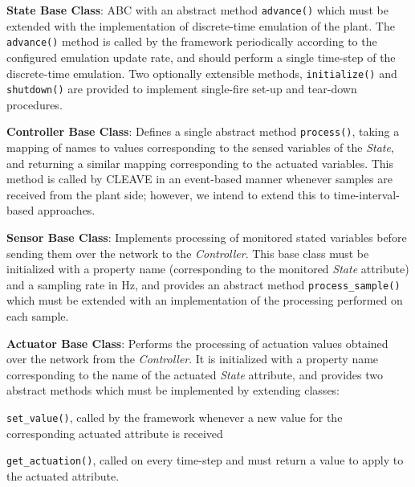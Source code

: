 \textbf{State Base Class}:
\gls{ABC} with an abstract method
\texttt{advance()} which must be extended with the implementation of discrete-time emulation of the plant.
The \texttt{advance()} method is called by the framework periodically according to the configured emulation update rate, and should perform a single time-step of the discrete-time emulation.
Two optionally extensible methods, \texttt{initialize()} and \texttt{shutdown()} are provided to implement single-fire set-up and tear-down procedures.


\textbf{Controller Base Class}:
Defines a single abstract method \texttt{process()}, taking a mapping of names to values corresponding to the sensed variables of the \emph{State}, and returning a similar mapping corresponding to the actuated variables.
This method is called by \gls{CLEAVE} in an event-based manner whenever samples are received from the plant side; however, we intend to extend this to time-interval-based approaches.

\textbf{Sensor Base Class}:
Implements processing of monitored stated variables before sending them over the network to the \emph{Controller}.
This base class must be initialized with a property name (corresponding to the monitored \emph{State} attribute) and a sampling rate in \si{\hertz}, and provides an abstract method \texttt{process_sample()} which must be extended with an implementation of the processing performed on each sample.

\textbf{Actuator Base Class}:
Performs the processing of actuation values obtained over the network from the \emph{Controller}.
It is initialized with a property name corresponding to the name of the actuated \emph{State} attribute, and provides two abstract methods which must be implemented by extending classes:
\begin{inlineenum}
\item \texttt{set_value()}, called by the framework whenever a new value for the corresponding actuated attribute is received
\item \texttt{get_actuation()}, called on every time-step and must return a value to apply to the actuated attribute.
\end{inlineenum}


